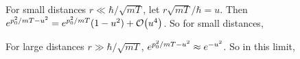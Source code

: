\documentclass[11pt]{article}
\begin{document}
{	For small distances $r \ll \hbar / \sqrt{m T}$, let $r \sqrt{m T} / \hbar = u$.  Then $e^{\po^2 / mT - u^2} = e^{\po^2 / mT} (1 - u^2) + \order{u^4}$.  So for small distances,
	
	For large distances $r \gg \hbar / \sqrt{m T}$, $e^{p_0^2 / mT - u^2} \approx e^{-u^2}$.  So in this limit,
	 
%	 
%	 
}
\end{document}
